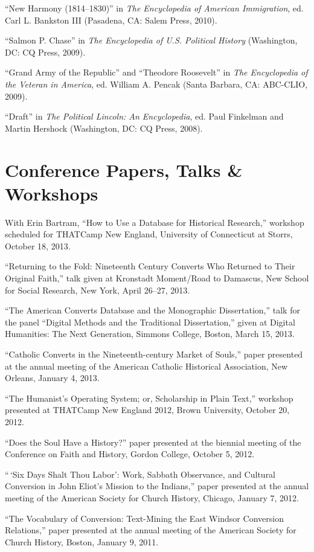 \documentclass[11pt]{article}
\begin{document}
``New Harmony (1814--1830)'' in \emph{The Encyclopedia of American
Immigration}, ed. Carl L. Bankston III (Pasadena, CA: Salem Press,
2010).

``Salmon P. Chase'' in \emph{The Encyclopedia of U.S. Political History}
(Washington, DC: CQ Press, 2009).

``Grand Army of the Republic'' and ``Theodore Roosevelt'' in \emph{The
Encyclopedia of the Veteran in America}, ed. William A. Pencak (Santa
Barbara, CA: ABC-CLIO, 2009).

``Draft'' in \emph{The Political Lincoln: An Encyclopedia}, ed. Paul
Finkelman and Martin Hershock (Washington, DC: CQ Press, 2008).

\section{Conference Papers, Talks \& Workshops}

With Erin Bartram, ``How to Use a Database for Historical
Research,'' workshop scheduled for THATCamp New England, University of 
Connecticut at Storrs, October 18, 2013.

``Returning to the Fold: Nineteenth Century Converts Who Returned to
Their Original Faith,'' talk given at Kronstadt Moment/Road to
Damascus, New School for Social Research, New York, April 26--27, 2013.

``The American Converts Database and the Monographic Dissertation,''
talk for the panel ``Digital Methods and the Traditional Dissertation,''
given at Digital Humanities: The Next Generation, Simmons College,
Boston, March 15, 2013.

``Catholic Converts in the Nineteenth-century Market of Souls,'' paper
presented at the annual meeting of the American Catholic Historical
Association, New Orleans, January 4, 2013.

``The Humanist's Operating System; or, Scholarship in Plain Text,''
workshop presented at THATCamp New England 2012, Brown University,
October 20, 2012.

``Does the Soul Have a History?'' paper presented at the biennial
meeting of the Conference on Faith and History, Gordon College, October
5, 2012.

``\,`Six Days Shalt Thou Labor': Work, Sabbath Observance, and Cultural
Conversion in John Eliot's Mission to the Indians,'' paper presented at
the annual meeting of the American Society for Church History, Chicago,
January 7, 2012.

``The Vocabulary of Conversion: Text-Mining the East Windsor Conversion
Relations,'' paper presented at the annual meeting of the American
Society for Church History, Boston, January 9, 2011.
\end{document}
